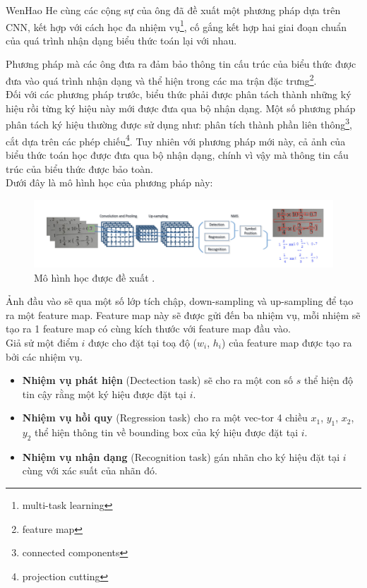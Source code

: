 \documentclass[a4paper,12pt]{article}
\begin{document}
	WenHao He cùng các cộng sự của ông đã đề xuất một phương pháp dựa trên CNN, kết hợp với cách học đa nhiệm vụ\footnote{multi-task learning}, cố gắng kết hợp hai giai đoạn chuẩn của quá trình nhận dạng biểu thức toán lại với nhau.
	
	Phương pháp mà các ông đưa ra đảm bảo thông tin cấu trúc của biểu thức được đưa vào quá trình nhận dạng và thể hiện trong các ma trận đặc trưng\footnote{feature map}\cite{yanlecun}. \\
	Đối với các phương pháp trước, biểu thức phải được phân tách thành những ký hiệu rồi từng ký hiệu này mới được đưa qua bộ nhận dạng. Một số phương pháp phân tách ký hiệu thường được sử dụng như: phân tích thành phần liên thông\footnote{connected components}, cắt dựa trên các phép chiếu\footnote{projection cutting}\cite{segment}. Tuy nhiên với phương pháp mới này, cả ảnh của biểu thức toán học được đưa qua bộ nhận dạng, chính vì vậy mà thông tin cấu trúc của biểu thức được bảo toàn. \\
	
	Dưới đây là mô hình học của phương pháp này:\\
	
	\begin{figure}[!h]
		\centering
		\includegraphics[width=0.9\linewidth]{context_aware.png}
		\vspace{0.2cm}
		\caption{Mô hình học được đề xuất \cite{context}.}
		
	\end{figure}
	
	Ảnh đầu vào sẽ qua một số lớp tích chập, down-sampling và up-sampling để tạo ra một feature map. Feature map này sẽ được gửi đến ba nhiệm vụ, mỗi nhiệm sẽ tạo ra 1 feature map có cùng kích thước với feature map đầu vào. \\
	Giả sử một điểm $i$ được cho đặt tại toạ độ ($w_i$, $h_i$) của feature map được tạo ra bởi các nhiệm vụ. 
	\begin{itemize}
		\item \textbf{Nhiệm vụ phát hiện} (Dectection task) sẽ cho ra một con số $s$ thể hiện độ tin cậy rằng một ký hiệu được đặt tại $i$.
		\item \textbf{Nhiệm vụ hồi quy} (Regression task) cho ra một vec-tor 4 chiều {$x_1$, $y_1$, $x_2$, $y_2$} thể hiện thông tin về bounding box của ký hiệu được đặt tại $i$.
		\item\textbf{Nhiệm vụ nhận dạng} (Recognition task) gán nhãn cho ký hiệu đặt tại $i$ cùng với xác suất của nhãn đó. 
	\end{itemize}
	
\end{document}
